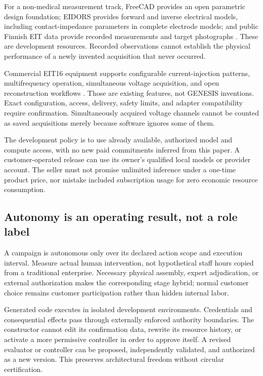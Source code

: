 \documentclass[11pt,letterpaper]{article}
\theoremstyle{remark}\newtheorem{remark}{Remark}[section]
\begin{document}
For a non-medical measurement track, FreeCAD provides an open parametric design foundation; EIDORS provides forward and inverse electrical models, including contact-impedance parameters in complete electrode models; and public Finnish EIT data provide recorded measurements and target photographs \citep{freecad,eidors,eidorscem,kitdata}. These are development resources. Recorded observations cannot establish the physical performance of a newly invented acquisition that never occurred.

Commercial EIT16 equipment supports configurable current-injection patterns, multifrequency operation, simultaneous voltage acquisition, and open reconstruction workflows \citep{sciospec}. Those are existing features, not GENESIS inventions. Exact configuration, access, delivery, safety limits, and adapter compatibility require confirmation. Simultaneously acquired voltage channels cannot be counted as saved acquisitions merely because software ignores some of them.

The development policy is to use already available, authorized model and compute access, with no new paid commitments inferred from this paper. A customer-operated release can use its owner's qualified local models or provider account. The seller must not promise unlimited inference under a one-time product price, nor mistake included subscription usage for zero economic resource consumption.

\subsection{Autonomy is an operating result, not a role label}
A campaign is autonomous only over its declared action scope and execution interval. Measure actual human intervention, not hypothetical staff hours copied from a traditional enterprise. Necessary physical assembly, expert adjudication, or external authorization makes the corresponding stage hybrid; normal customer choice remains customer participation rather than hidden internal labor.

Generated code executes in isolated development environments. Credentials and consequential effects pass through externally enforced authority boundaries. The constructor cannot edit its confirmation data, rewrite its resource history, or activate a more permissive controller in order to approve itself. A revised evaluator or controller can be proposed, independently validated, and authorized as a new version. This preserves architectural freedom without circular certification.
\end{document}
